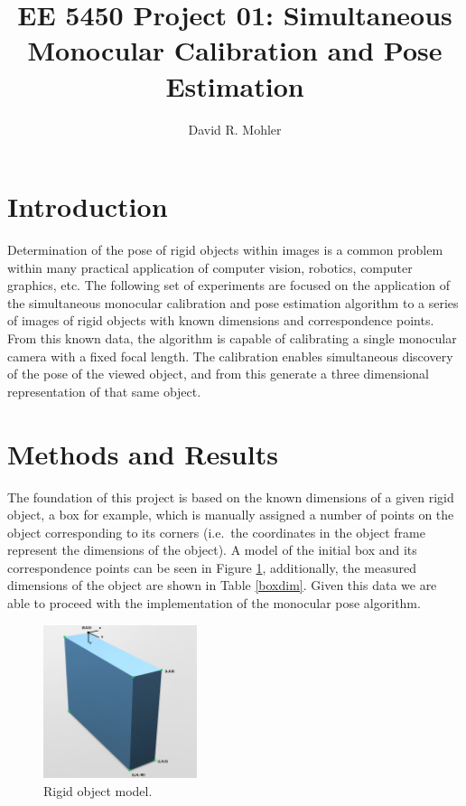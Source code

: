 \documentclass[12pt]{article}
\begin{document}
\title{EE 5450  Project 01: Simultaneous Monocular Calibration and Pose Estimation}

\author{David R. Mohler}


\maketitle

\section{Introduction} 
Determination of the pose of rigid objects within images is a common problem within many practical application of computer vision, robotics, computer graphics, etc. The following set of experiments are focused on the application of the simultaneous monocular calibration and pose estimation algorithm to a series of images of rigid objects with known dimensions and correspondence points. From this known data, the algorithm is capable of calibrating a single monocular camera with a fixed focal length. The calibration enables simultaneous discovery of the pose of the viewed object, and from this generate a three dimensional representation of that same object.  

\section{Methods and Results}
The foundation of this project is based on the known dimensions of a given rigid object, a box for example, which is  manually assigned a number of points on the object corresponding to its corners (i.e.\ the coordinates in the object frame represent the dimensions of the object). A model of the initial box and its correspondence points can be seen in Figure \ref{box}, additionally, the measured dimensions of the object are shown in Table \ref{boxdim}. Given this data we are able to proceed with the implementation of the monocular pose algorithm. 

\begin{figure}[h]
	\centering %
	\includegraphics[width=0.4\textwidth]{BoxModel.png}
	\caption{Rigid object model.} \label{box}
\end{figure}
\end{document}

